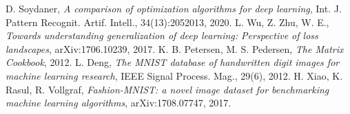 \documentclass[a4paper,12pt]{article}
\begin{document}
\begin{thebibliography}{9}
   D. Soydaner, \textit{A comparison of optimization algorithms for deep learning}, Int. J. Pattern Recognit. Artif. Intell., 34(13):2052013, 2020.
   L. Wu, Z. Zhu, W. E., \textit{Towards understanding generalization of deep learning: Perspective of loss landscapes}, arXiv:1706.10239, 2017.
   K. B. Petersen, M. S. Pedersen, \textit{The Matrix Cookbook}, 2012.
   L. Deng, \textit{The MNIST database of handwritten digit images for machine learning research}, IEEE Signal Process. Mag., 29(6), 2012.
   H. Xiao, K. Rasul, R. Vollgraf, \textit{Fashion-MNIST: a novel image dataset for benchmarking machine learning algorithms}, arXiv:1708.07747, 2017.
\end{thebibliography}
\end{document}
